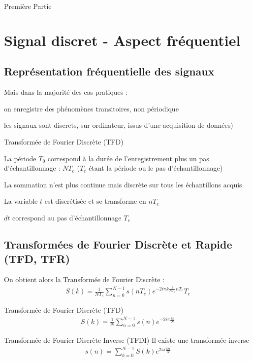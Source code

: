 \documentclass{beamer}
\begin{document}
\begin{frame}{Première Partie}
	\tableofcontents
\end{frame}

\section{Signal discret - Aspect fréquentiel}
\subsection{Représentation fréquentielle des signaux}
\begin{frame}
\begin{exampleblock}{Mais dans la majorité des cas pratiques :}
\itemize\justifying
  \item on enregistre des phénomènes transitoires, non
  périodique
  \item les signaux sont discrets, sur ordinateur, issus d'une 
  acquisition de données)
\end{exampleblock} 
\center{\textcolor{red}{À quoi peut donc bien servir la série de Fourier ? =>
TFD}}
\pause
\begin{alertblock}{Transformée de Fourier Discrète (TFD)}
\itemize\justifying
  \item La période $T_0$ correspond à la durée de l'enregistrement plus un
  pas d'échantillonnage : $NT_e$ ($T_e$ étant la période ou le pas
  d'échantillonnage)
  \item La sommation n'est plus continue mais discrète sur tous les échantillons
  acquis
  \item La variable $t$ est discrétisée et se transforme en $nT_e$
  \item $dt$ correspond au pas d'échantillonnage $T_e$
\end{alertblock}
\end{frame}

\subsection{Transformées de Fourier Discrète et Rapide (TFD, TFR)}
\begin{frame}
On obtient alors la Transformée de Fourier Discrète :
\begin{align*}
S(k) = \frac{1}{NT_e}\sum_{n=0}^{N-1}s(nT_e)e^{-2i\pi k \frac{1}{NT_e} nT_e}T_e
\end{align*}
\begin{block}{Transformée de Fourier Discrète (TFD)}
\begin{align*}
S(k) = \frac{1}{N}\sum_{n=0}^{N-1}s(n)e^{-2i\pi \frac{kn}{N}}
\end{align*}
\end{block}
\pause
\begin{block}{Transformée de Fourier Discrète Inverse (TFDI)}
Il existe une transformée inverse
\begin{align*}
s(n) = \sum_{k=0}^{N-1}S(k)e^{2i\pi \frac{kn}{N}}
\end{align*}
\end{block}

\end{frame}
\end{document}
